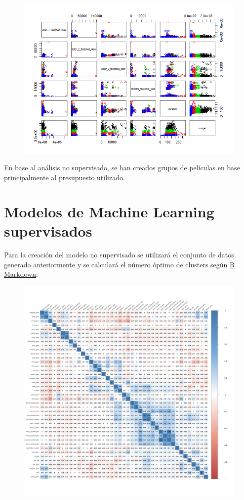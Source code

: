 \documentclass{article}
\begin{document}
\begin{figure}[h]
\centering
\includegraphics[width=5in,clip,keepaspectratio]{./model_no_supervised_files/figure-markdown_github/unnamed-chunk-2-2}
\end{figure}

En base al análisis no supervisado, se han creados grupos de películas en base principalmente al presupuesto utilizado. 

\clearpage

\section{Modelos de Machine Learning supervisados}

Para la creación del modelo no supervisado se utilizará el conjunto de datos generado anteriormente y se calculará el número óptimo de clusters según \href{https://github.com/pozueco/proyecto_fin_de_master/blob/master/model_supervised.md}{R Markdown}:

\begin{figure}[h]
\centering
\includegraphics[width=6in,clip,keepaspectratio]{./model_supervised_files/figure-markdown_github/unnamed-chunk-3-1}
\end{figure}
\end{document}
